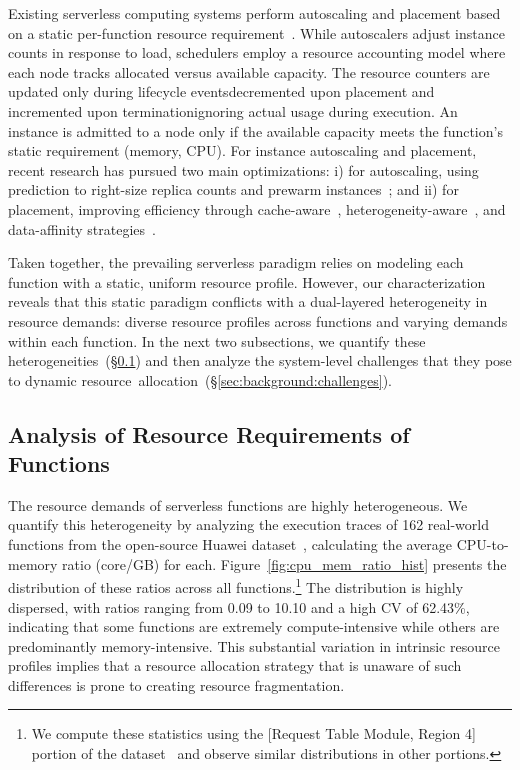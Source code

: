 Existing serverless computing systems perform autoscaling and placement based on a static per-function resource requirement~\cite{aws_scaling_window, aws_scaling_eq, knative_scaling}. While autoscalers adjust instance counts in response to load, schedulers employ a resource accounting model where each node tracks allocated versus available capacity. The resource counters are updated only during lifecycle events\textemdash decremented upon placement and incremented upon termination\textemdash ignoring actual usage during execution. An instance is admitted to a node only if the available capacity meets the function's static requirement (\eg memory, CPU). For instance autoscaling and placement, recent research has pursued two main optimizations: i) for autoscaling, using prediction to right-size replica counts and prewarm instances~\cite{ShahradFGCBCLTR20, ORION_MahgoubYSECB22}; and ii) for placement, improving efficiency through cache-aware~\cite{SOCK_OakesYZHHAA18}, heterogeneity-aware~\cite{RoyPT22}, and data-affinity strategies~\cite{Wukong_CarverZWAWC20, ORION_MahgoubYSECB22}.

Taken together, the prevailing serverless paradigm relies on modeling each function with a static, uniform resource profile. However, our characterization reveals that this static paradigm conflicts with a dual-layered heterogeneity in resource demands: diverse resource profiles across functions and varying demands within each function. In the next two subsections, we quantify these heterogeneities~(\S\ref{sec:background:demand-analysis}) and then analyze the system-level challenges that they pose to dynamic resource~allocation~(\S\ref{sec:background:challenges}).

\vspace{-7pt}
\subsection{Analysis of Resource Requirements of Functions}
\label{sec:background:demand-analysis}
\vspace{-7pt}

The resource demands of serverless functions are highly heterogeneous. We quantify this heterogeneity by analyzing the execution traces of 162 real-world functions from the open-source Huawei dataset~\cite{huawei_dataset}, calculating the average CPU-to-memory ratio (core/GB) for each. Figure~\ref{fig:cpu_mem_ratio_hist} presents the distribution of these ratios across all functions.\footnote{We compute these statistics using the [Request Table Module, Region 4] portion of the dataset~\cite{huawei_dataset} and observe similar distributions in other portions.} The distribution is highly dispersed, with ratios ranging from 0.09 to 10.10 and a high CV of 62.43\%, indicating that some functions are extremely compute-intensive while others are predominantly memory-intensive. This substantial variation in intrinsic resource profiles implies that a resource allocation strategy that is unaware of such differences is prone to creating resource fragmentation.


